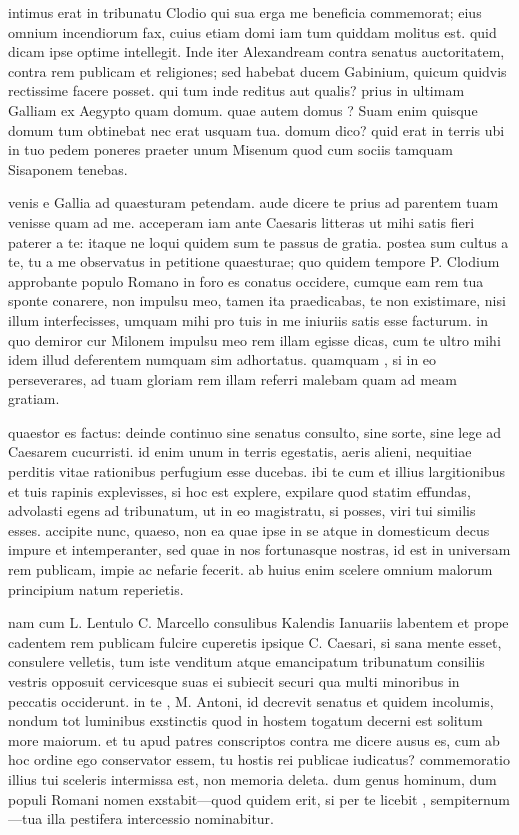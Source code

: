  intimus erat in tribunatu Clodio qui sua erga me beneficia commemorat; eius omnium incendiorum fax, cuius etiam domi iam tum quiddam molitus est. quid dicam ipse optime intellegit. Inde iter Alexandream contra senatus auctoritatem, contra rem publicam et religiones; sed habebat ducem Gabinium, quicum quidvis rectissime facere posset. qui tum inde reditus aut qualis? prius in ultimam Galliam ex Aegypto quam domum. quae autem domus ? Suam enim quisque domum tum obtinebat nec erat usquam tua. domum dico? quid erat in terris ubi in tuo pedem poneres praeter unum Misenum quod cum sociis tamquam Sisaponem tenebas.

 venis e Gallia ad quaesturam petendam. aude dicere te prius ad parentem tuam venisse quam ad me. acceperam iam ante Caesaris litteras ut mihi satis fieri paterer a te: itaque ne loqui quidem sum te passus de gratia. postea sum cultus a te, tu a me observatus in petitione quaesturae; quo quidem tempore P. Clodium approbante populo Romano in foro es conatus occidere, cumque eam rem tua sponte conarere, non impulsu meo, tamen ita praedicabas, te non existimare, nisi illum interfecisses, umquam mihi pro tuis in me iniuriis satis esse facturum. in quo demiror cur Milonem impulsu meo rem illam egisse dicas, cum te ultro mihi idem illud deferentem numquam sim adhortatus. quamquam , si in eo perseverares, ad tuam gloriam rem illam referri malebam quam ad meam gratiam.

 quaestor es factus: deinde continuo sine senatus consulto, sine sorte, sine lege ad Caesarem cucurristi. id enim unum in terris egestatis, aeris alieni, nequitiae perditis vitae rationibus perfugium esse ducebas. ibi te cum et illius largitionibus et tuis rapinis explevisses, si hoc est explere, expilare quod statim effundas, advolasti egens ad tribunatum, ut in eo magistratu, si posses, viri tui similis esses. accipite nunc, quaeso, non ea quae ipse in se atque in domesticum decus impure et intemperanter, sed quae in nos fortunasque nostras, id est in universam rem publicam, impie ac nefarie fecerit. ab huius enim scelere omnium malorum principium natum reperietis.

 nam cum L. Lentulo C. Marcello consulibus Kalendis Ianuariis labentem et prope cadentem rem publicam fulcire cuperetis ipsique C. Caesari, si sana mente esset, consulere velletis, tum iste venditum atque emancipatum tribunatum consiliis vestris opposuit cervicesque suas ei subiecit securi qua multi minoribus in peccatis occiderunt. in te , M. Antoni, id decrevit senatus et quidem incolumis, nondum tot luminibus exstinctis quod in hostem togatum decerni est solitum more maiorum. et tu apud patres conscriptos contra me dicere ausus es, cum ab hoc ordine ego conservator essem, tu hostis rei publicae iudicatus? commemoratio illius tui sceleris intermissa est, non memoria deleta. dum genus hominum, dum populi Romani nomen exstabit—quod quidem erit, si per te licebit , sempiternum—tua illa pestifera intercessio nominabitur.

